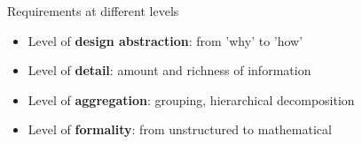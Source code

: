 \begin{Slide}{Requirements at different levels}

\begin{itemize}
\item Level of \textbf{design abstraction}: \hfill from 'why' to 'how' 
\item Level of \textbf{detail}: \hfill amount and richness of information 
\item Level of \textbf{aggregation}: \hfill grouping, hierarchical decomposition 
\item Level of \textbf{formality}: \hfill from unstructured to mathematical


\end{itemize}
\end{Slide}